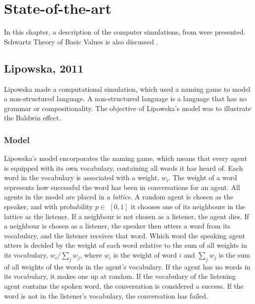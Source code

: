 \acresetall
\chapter{State-of-the-art}\label{ch:LitteratureStudy}

In this chapter, a description of the computer simulations, from \citet{lipowska2011naming, gong2004computational, munroe2002learning, lekvam2014co} were presented. Schwartz Theory of Basic Values is also discussed \citep{schwartz2012overview}.

\section{Lipowska, 2011}\label{sec:Lipowska}
Lipowska made a computational simulation, which used a naming game to model a non-structured language. A non-structured language is a language that has no grammar or compositionality. The objective of Lipowska's model was to illustrate the Baldwin effect. 

\subsection{Model}
Lipowska's model encorporates the naming game, which means that every agent is equipped with its own vocabulary, containing all words it has heard of. Each word in the vocabulary is associated with a weight, $w_{i}$. The weight of a word represents how successful the word has been in conversations for an agent. All agents in the model are placed in a \textit{lattice}. A random agent is chosen as the speaker, and with probability $p\in$ $[0, 1]$ it chooses one of its neighbours in the lattice as the listener. If a neighbour is not chosen as a listener, the agent dies. If a neighbour is chosen as a listener, the speaker then utters a word from its vocabulary, and the listener receives that word. Which word the speaking agent utters is decided by the weight of each word relative to the sum of all weights in its vocabulary, $w_{i} / \sum_{j} w_{j}$, where $w_i$ is the weight of word $i$ and $\sum_{j} w_{j}$ is the sum of all weights of the words in the agent's vocabulary. If the agent has no words in its vocabulary, it makes one up at random. If the vocabulary of the listening agent contains the spoken word, the conversation is considered a success. If the word is not in the listener's vocabulary, the conversation has failed. 

